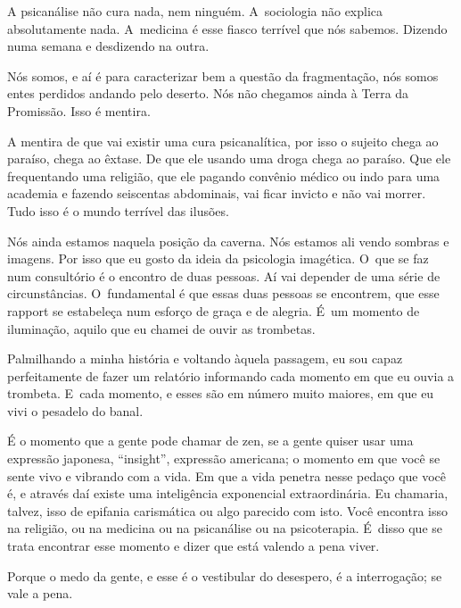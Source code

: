  

A psicanálise não cura nada, nem ninguém. A~sociologia não explica
absolutamente nada. A~medicina é esse fiasco terrível que nós sabemos.
Dizendo numa semana e desdizendo na outra.

 

Nós somos, e aí é para caracterizar bem a questão da fragmentação, nós
somos entes perdidos andando pelo deserto. Nós não chegamos ainda à
Terra da Promissão. Isso é mentira.

 

A mentira de que vai existir uma cura psicanalítica, por isso o
sujeito chega ao paraíso, chega ao êxtase. De que ele usando uma droga
chega ao paraíso. Que ele frequentando uma religião, que ele pagando
convênio médico ou indo para uma academia e fazendo seiscentas
abdominais, vai ficar invicto e não vai morrer. Tudo isso é o mundo
terrível das ilusões.

 

Nós ainda estamos naquela posição da caverna. Nós estamos ali vendo
sombras e imagens. Por isso que eu gosto da ideia da psicologia
imagética. O~que se faz num consultório é o encontro de duas pessoas. Aí
vai depender de uma série de circunstâncias. O~fundamental é que essas
duas pessoas se encontrem, que esse rapport se estabeleça num esforço de
graça e de alegria. É~um momento de iluminação, aquilo que eu chamei de
ouvir as trombetas.

 

Palmilhando a minha história e voltando àquela passagem, eu sou capaz
perfeitamente de fazer um relatório informando cada momento em que eu
ouvia a trombeta. E~cada momento, e esses são em número muito maiores,
em que eu vivi o pesadelo do banal.

 

É o momento que a gente pode chamar de zen, se a gente quiser usar uma
expressão japonesa, ``insight'', expressão americana; o momento em que
você se sente vivo e vibrando com a vida. Em que a vida penetra nesse
pedaço que você é, e através daí existe uma inteligência exponencial
extraordinária. Eu chamaria, talvez, isso de epifania carismática ou algo
parecido com isto. Você encontra isso na religião, ou na medicina ou na
psicanálise ou na psicoterapia. É~disso que se trata encontrar esse
momento e dizer que está valendo a pena viver.

 

Porque o medo da gente, e esse é o vestibular do desespero, é a
interrogação; se vale a pena.

